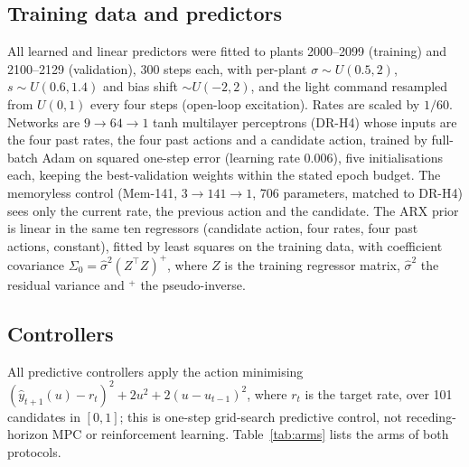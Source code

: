 \documentclass[11pt]{article}
\begin{document}
\subsection{Training data and predictors}
All learned and linear predictors were fitted to plants 2000--2099 (training) and 2100--2129 (validation), 300 steps each, with per-plant $\sigma\sim U(0.5,2)$, $s\sim U(0.6,1.4)$ and bias shift $\sim U(-2,2)$, and the light command resampled from $U(0,1)$ every four steps (open-loop excitation). Rates are scaled by $1/60$. Networks are $9\to64\to1$ tanh multilayer perceptrons (DR-H4) whose inputs are the four past rates, the four past actions and a candidate action, trained by full-batch Adam on squared one-step error (learning rate 0.006), five initialisations each, keeping the best-validation weights within the stated epoch budget. The memoryless control (Mem-141, $3\to141\to1$, 706 parameters, matched to DR-H4) sees only the current rate, the previous action and the candidate. The ARX prior is linear in the same ten regressors (candidate action, four rates, four past actions, constant), fitted by least squares on the training data, with coefficient covariance $\Sigma_0=\hat\sigma^2(Z^\top Z)^{+}$, where $Z$ is the training regressor matrix, $\hat\sigma^2$ the residual variance and $^{+}$ the pseudo-inverse.

\subsection{Controllers}
All predictive controllers apply the action minimising $(\hat y_{t+1}(u)-r_t)^2+2u^2+2(u-u_{t-1})^2$, where $r_t$ is the target rate, over 101 candidates in $[0,1]$; this is one-step grid-search predictive control, not receding-horizon MPC or reinforcement learning. Table~\ref{tab:arms} lists the arms of both protocols.
\end{document}
